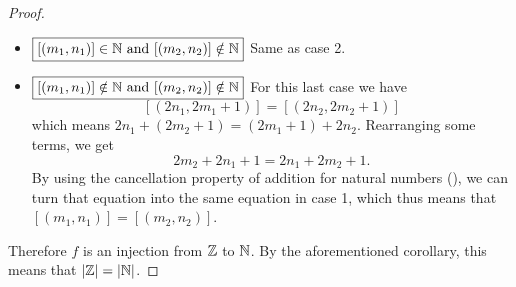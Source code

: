 \begin{proof}
\begin{itemize}
        \item $\boxed{[(m_1, n_1)] \in \mathbb{N} \text{ and } [(m_2, n_2)] \notin \mathbb{N}}$ Same as case 2.
        
        \item $\boxed{[(m_1, n_1)] \notin \mathbb{N} \text{ and } [(m_2, n_2)] \notin \mathbb{N}}$ For this last case we have
        \[
            [(2n_1, 2m_1 + 1)] = [(2n_2, 2m_2 + 1)]
        \]
        which means $2n_1 + (2m_2 + 1) = (2m_1 + 1) + 2n_2$. Rearranging some terms, we get
        \[
            2m_2 + 2n_1 + 1 = 2n_1 + 2m_2 + 1.
        \]
        By using the cancellation property of addition for natural numbers (), we can turn that equation into the same equation in case 1, which thus means that $[(m_1, n_1)] = [(m_2, n_2)]$.
    \end{itemize}
    Therefore $f$ is an injection from $\mathbb{Z}$ to $\mathbb{N}$. By the aforementioned corollary, this means that $|\mathbb{Z}| = |\mathbb{N}|$.
\end{proof}
